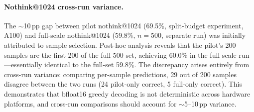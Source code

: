 \paragraph{Nothink@1024 cross-run variance.}
The ${\sim}$10\,pp gap between pilot nothink@1024 (69.5\%, split-budget experiment, A100) and full-scale nothink@1024 (59.8\%, $n{=}500$, separate run) was initially attributed to sample selection.
Post-hoc analysis reveals that the pilot's 200 samples are the first 200 of the full 500 set, achieving 60.0\% in the full-scale run---essentially identical to the full-set 59.8\%.
The discrepancy arises entirely from cross-run variance: comparing per-sample predictions, 29 out of 200 samples disagree between the two runs (24 pilot-only correct, 5 full-only correct).
This demonstrates that bfloat16 greedy decoding is not deterministic across hardware platforms, and cross-run comparisons should account for ${\sim}$5--10\,pp variance.
